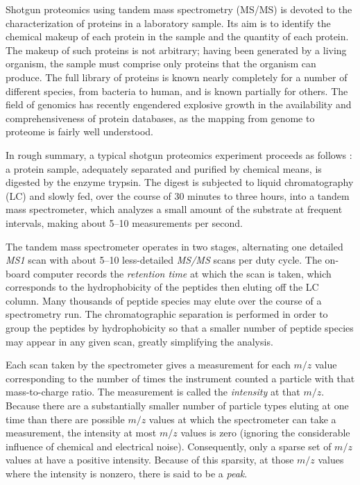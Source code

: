 \documentclass[12pt,twoside,openright]{report}
\begin{document}
Shotgun proteomics using tandem mass spectrometry (MS/MS) is devoted to the
characterization of proteins in a laboratory sample. Its aim is to identify the
chemical makeup of each protein in the sample and the quantity of each
protein. The makeup of such proteins is not arbitrary; having been generated by
a living organism, the sample must comprise only proteins that the organism can
produce. The full library of proteins is known nearly completely for a number of
different species, from bacteria to human, and is known partially for
others. The field of genomics has recently engendered explosive growth in the
availability and comprehensiveness of protein databases, as the mapping from
genome to proteome is fairly well understood.

In rough summary, a typical shotgun proteomics experiment proceeds as follows
\cite{steen:abcs}: a protein sample, adequately separated and purified by
chemical means, is digested by the enzyme trypsin. The digest is subjected to
liquid chromatography (LC) and slowly fed, over the course of 30 minutes to
three hours, into a tandem mass spectrometer, which analyzes a small amount of
the substrate at frequent intervals, making about 5--10 measurements per second.

The tandem mass spectrometer operates in two stages, alternating one detailed
{\it MS1} scan with about 5--10 less-detailed {\it MS/MS} scans per duty
cycle. The on-board computer records the {\it retention time} at which the scan
is taken, which corresponds to the hydrophobicity of the peptides then eluting
off the LC column. Many thousands of peptide species may elute over the course
of a spectrometry run. The chromatographic separation is performed in order to
group the peptides by hydrophobicity so that a smaller number of peptide species
may appear in any given scan, greatly simplifying the analysis.

Each scan taken by the spectrometer gives a measurement for each $m/z$ value
corresponding to the number of times the instrument counted a particle with that
mass-to-charge ratio. The measurement is called the {\it intensity} at that
$m/z$.  Because there are a substantially smaller number of particle types
eluting at one time than there are possible $m/z$ values at which the
spectrometer can take a measurement, the intensity at most $m/z$ values is zero
(ignoring the considerable influence of chemical and electrical
noise). Consequently, only a sparse set of $m/z$ values at have a positive
intensity. Because of this sparsity, at those $m/z$ values where the intensity
is nonzero, there is said to be a {\it peak}.
\end{document}
